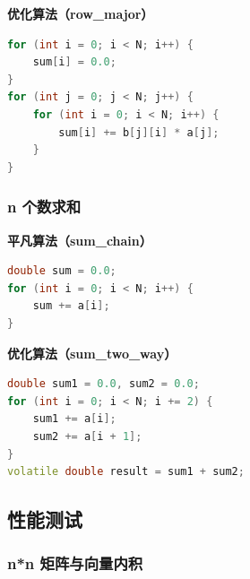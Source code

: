 ﻿\documentclass[9pt,a4paper]{article}
\begin{document}
\textbf{优化算法（row\_major）}
\begin{lstlisting}[language=C++]
for (int i = 0; i < N; i++) {
    sum[i] = 0.0;
}
for (int j = 0; j < N; j++) {
    for (int i = 0; i < N; i++) {
        sum[i] += b[j][i] * a[j];
    }
}
\end{lstlisting}

\subsubsection{n 个数求和}
\textbf{平凡算法（sum\_chain）}
\begin{lstlisting}[language=C++]
double sum = 0.0;
for (int i = 0; i < N; i++) {
    sum += a[i];
}
\end{lstlisting}

\textbf{优化算法（sum\_two\_way）}
\begin{lstlisting}[language=C++]
double sum1 = 0.0, sum2 = 0.0;
for (int i = 0; i < N; i += 2) {
    sum1 += a[i];
    sum2 += a[i + 1];
}
volatile double result = sum1 + sum2;
\end{lstlisting}

\subsection{性能测试}
\subsubsection{n*n 矩阵与向量内积}
\begin{table}[H]
\centering
\caption{n*n 矩阵与向量内积性能测试}
\end{table}
\end{document}

